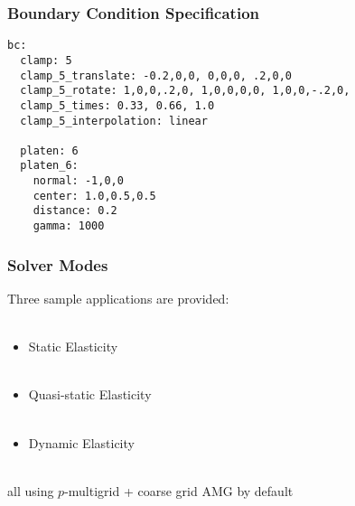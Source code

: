 \documentclass{beamer}
\begin{document}

\begin{frame}[fragile]
\begin{center}
\frametitle{Boundary Condition Specification}

{\footnotesize
\begin{lstlisting}[style=yaml]
bc:
  clamp: 5
  clamp_5_translate: -0.2,0,0, 0,0,0, .2,0,0
  clamp_5_rotate: 1,0,0,.2,0, 1,0,0,0,0, 1,0,0,-.2,0,
  clamp_5_times: 0.33, 0.66, 1.0
  clamp_5_interpolation: linear

  platen: 6
  platen_6:
    normal: -1,0,0
    center: 1.0,0.5,0.5
    distance: 0.2
    gamma: 1000
\end{lstlisting}
}

\end{center}
\end{frame}


\begin{frame}
\begin{center}
\frametitle{Solver Modes}

Three sample applications are provided:\\

~\\

\begin{itemize}

\item Static Elasticity\\

~\\

\item Quasi-static Elasticity\\

~\\

\item Dynamic Elasticity\\

\end{itemize}

~\\

all using $p$-multigrid + coarse grid AMG by default

\end{center}
\end{frame}

\end{document}
